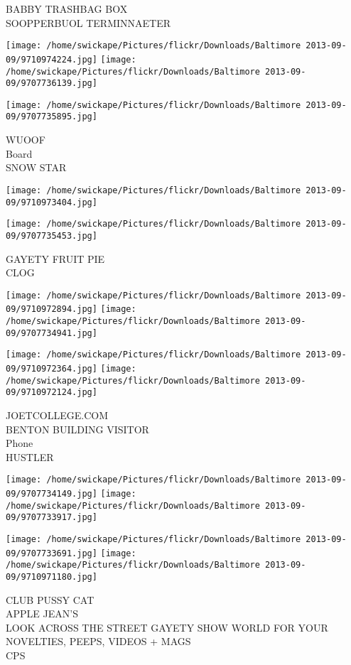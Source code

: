 \documentclass[10pt,letterpaper]{article}
\begin{document}
BABBY TRASHBAG BOX\\
SOOPPERBUOL TERMINNAETER
\pagebreak

\texttt{[image: /home/swickape/Pictures/flickr/Downloads/Baltimore 2013-09-09/9710974224.jpg]}
\texttt{[image: /home/swickape/Pictures/flickr/Downloads/Baltimore 2013-09-09/9707736139.jpg]}

\vspace{0.25in}
\texttt{[image: /home/swickape/Pictures/flickr/Downloads/Baltimore 2013-09-09/9707735895.jpg]}

WUOOF\\
Board\\
SNOW STAR
\pagebreak

\texttt{[image: /home/swickape/Pictures/flickr/Downloads/Baltimore 2013-09-09/9710973404.jpg]}

\vspace{0.25in}
\texttt{[image: /home/swickape/Pictures/flickr/Downloads/Baltimore 2013-09-09/9707735453.jpg]}

GAYETY FRUIT PIE\\
CLOG
\pagebreak

\texttt{[image: /home/swickape/Pictures/flickr/Downloads/Baltimore 2013-09-09/9710972894.jpg]}
\texttt{[image: /home/swickape/Pictures/flickr/Downloads/Baltimore 2013-09-09/9707734941.jpg]}

\texttt{[image: /home/swickape/Pictures/flickr/Downloads/Baltimore 2013-09-09/9710972364.jpg]}
\texttt{[image: /home/swickape/Pictures/flickr/Downloads/Baltimore 2013-09-09/9710972124.jpg]}

JOETCOLLEGE.COM\\
BENTON BUILDING VISITOR\\
Phone\\
HUSTLER
\pagebreak

\texttt{[image: /home/swickape/Pictures/flickr/Downloads/Baltimore 2013-09-09/9707734149.jpg]}
\texttt{[image: /home/swickape/Pictures/flickr/Downloads/Baltimore 2013-09-09/9707733917.jpg]}

\texttt{[image: /home/swickape/Pictures/flickr/Downloads/Baltimore 2013-09-09/9707733691.jpg]}
\texttt{[image: /home/swickape/Pictures/flickr/Downloads/Baltimore 2013-09-09/9710971180.jpg]}

CLUB PUSSY CAT\\
APPLE JEAN'S\\
LOOK ACROSS THE STREET GAYETY SHOW WORLD FOR YOUR NOVELTIES, PEEPS, VIDEOS + MAGS\\
CPS
\pagebreak
\end{document}
